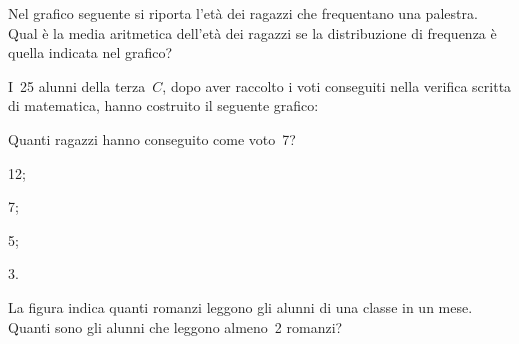 \begin{esercizio}
\label{ese:A.55}
Nel grafico seguente si riporta l'età dei ragazzi che frequentano una palestra. Qual è la media aritmetica dell'età dei ragazzi
se la distribuzione di frequenza è quella indicata nel grafico?
\begin{center}
 
\end{center}
\end{esercizio}
\newpage
\begin{esercizio}
\label{ese:A.56}
I~25 alunni della terza~$C$, dopo aver raccolto i voti conseguiti
nella verifica scritta di matematica, hanno costruito il seguente grafico:
\begin{center}
 
\end{center}
Quanti ragazzi hanno conseguito come voto~7?
\begin{multicols}{4}
 \begin{enumeratea}
 \item 12;
 \item 7;
 \item 5;
 \item 3.
\end{enumeratea}
\end{multicols}
\end{esercizio}

\begin{esercizio}
\label{ese:A.57}
La figura indica quanti romanzi leggono gli alunni di una classe in un mese. Quanti sono gli alunni che leggono almeno~2 romanzi?
\begin{center}
 
\end{center}
\end{esercizio}

